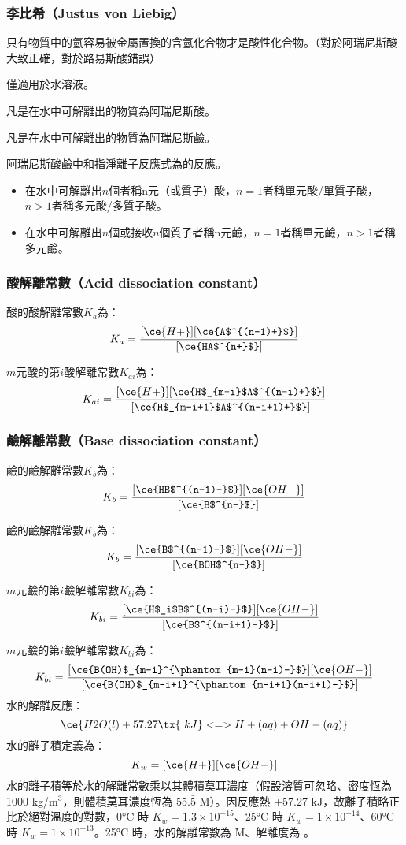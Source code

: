 \documentclass[a4paper,12pt]{article}
\begin{document}
\subsubsection{李比希（Justus von Liebig）}
只有物質中的氫容易被金屬置換的含氫化合物才是酸性化合物。（對於阿瑞尼斯酸大致正確，對於路易斯酸錯誤）
\bit
\item 僅適用於水溶液。
\item 凡是在水中可解離出的物質為阿瑞尼斯酸。
\item 凡是在水中可解離出的物質為阿瑞尼斯鹼。
\item 阿瑞尼斯酸鹼中和指淨離子反應式為的反應。
\eit
{}
\begin{itemize}
\item 在水中可解離出$n$個者稱n元（或質子）酸，$n=1$者稱單元酸/單質子酸，$n>1$者稱多元酸/多質子酸。
\item 在水中可解離出$n$個或接收$n$個質子者稱n元鹼，$n=1$者稱單元鹼，$n>1$者稱多元鹼。
\end{itemize}
\subsubsection{酸解離常數（Acid dissociation constant）}
酸的酸解離常數$K_a$為：
\[K_a=\frac{[\ce{H+}][\ce{A$^{(n-1)+}$}]}{[\ce{HA$^{n+}$}]}\]

$m$元酸的第$i$酸解離常數$K_{ai}$為：
\[K_{ai}=\frac{[\ce{H+}][\ce{H$_{m-i}$A$^{(n-i)+}$}]}{[\ce{H$_{m-i+1}$A$^{(n-i+1)+}$}]}\]
\subsubsection{鹼解離常數（Base dissociation constant）}
鹼的鹼解離常數$K_b$為：
\[K_b=\frac{[\ce{HB$^{(n-1)-}$}][\ce{OH-}]}{[\ce{B$^{n-}$}]}\]

鹼的鹼解離常數$K_b$為：
\[K_b=\frac{[\ce{B$^{(n-1)-}$}][\ce{OH-}]}{[\ce{BOH$^{n-}$}]}\]

$m$元鹼的第$i$鹼解離常數$K_{bi}$為：
\[K_{bi}=\frac{[\ce{H$_i$B$^{(n-i)-}$}][\ce{OH-}]}{[\ce{B$^{(n-i+1)-}$}]}\]

$m$元鹼的第$i$鹼解離常數$K_{bi}$為：
\[K_{bi}=\frac{[\ce{B(OH)$_{m-i}^{\phantom{m-i}(n-i)-}$}][\ce{OH-}]}{[\ce{B(OH)$_{m-i+1}^{\phantom{m-i+1}(n-i+1)-}$}]}\]
水的解離反應：
\[\ce{H2O(l) + 57.27\tx{\ kJ} <=> H+(aq) + OH-(aq)}\]
水的離子積定義為：
\[K_w = [\ce{H+}][\ce{OH-}]\]
水的離子積等於水的解離常數乘以其體積莫耳濃度（假設溶質可忽略、密度恆為 1000 kg/m$^3$，則體積莫耳濃度恆為 55.$\bar{5}$ M）。因反應熱 +57.27 kJ，故離子積略正比於絕對溫度的對數，0°C 時 \( K_w = 1.3 \times 10^{-15} \)、25°C 時 \( K_w = 1 \times 10^{-14} \)、60°C 時 \( K_w = 1 \times 10^{-13} \)。25°C 時，水的解離常數為  M、解離度為 。
\end{document}
